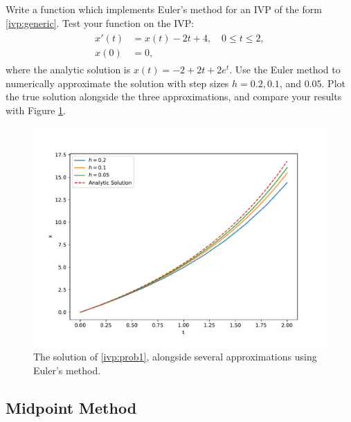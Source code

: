 \begin{problem} Write a function which implements Euler's method for an IVP of the form \eqref{ivp:generic}. Test your function on the IVP:
\begin{align}
	\begin{split}
		x' (t)&= x(t) - 2t + 4,\quad 0 \leq t \leq 2, \\
		x(0) &= 0,
	\end{split}\label{ivp:prob1}
\end{align}
where the analytic solution is $x(t) = -2+2t + 2e^t.$
Use the Euler method to numerically approximate the solution with step sizes $h = 0.2, 0.1$, and $0.05.$ Plot the true solution alongside the three approximations, and compare your results with Figure \ref{ivp:euler}.
\end{problem}

\begin{figure}
\centering
\includegraphics[width=150mm]{euler.pdf}
\caption{The solution of \eqref{ivp:prob1}, alongside several approximations using Euler's method.}
\label{ivp:euler}
\end{figure}

\subsection*{Midpoint Method}

